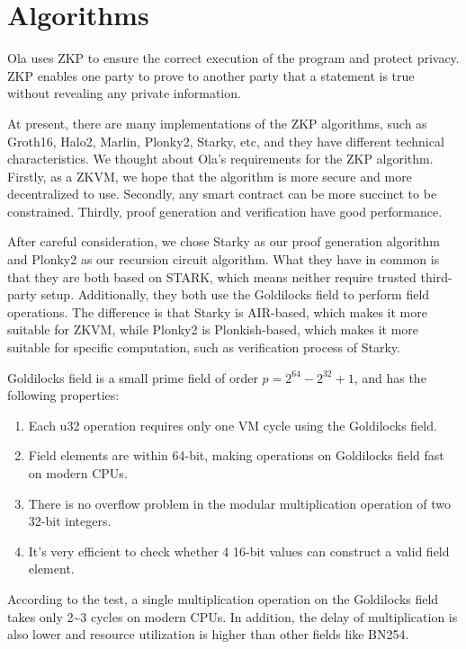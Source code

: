 \section{Algorithms} \label{sec:algorithms}
Ola uses ZKP to ensure the correct execution of the program and protect privacy. ZKP enables one party to prove to another party that a statement is true without revealing any private information.

At present, there are many implementations of the ZKP algorithms, such as Groth16, Halo2, Marlin, Plonky2, Starky, etc, and they have different technical characteristics. We thought about Ola's requirements for the ZKP algorithm. Firstly, as a ZKVM, we hope that the algorithm is more secure and more decentralized to use. Secondly, any smart contract can be more succinct to be constrained. Thirdly, proof generation and verification have good performance.

After careful consideration, we chose Starky as our proof generation algorithm and Plonky2 as our recursion circuit algorithm. What they have in common is that they are both based on STARK, which means neither require trusted third-party setup. Additionally, they both use the Goldilocks field to perform field operations. The difference is that Starky is AIR-based, which makes it more suitable for ZKVM, while Plonky2 is Plonkish-based, which makes it more suitable for specific computation, such as verification process of Starky.

Goldilocks field is a small prime field of order $p = 2^{64} - 2^{32} + 1$, and has the following properties:

\begin{enumerate}
    \item Each u32 operation requires only one VM cycle using the Goldilocks field.
    \item Field elements are within 64-bit, making operations on Goldilocks field fast on modern CPUs.
    \item There is no overflow problem in the modular multiplication operation of two 32-bit integers.
    \item It's very efficient to check whether 4 16-bit values can construct a valid field element.
\end{enumerate}

According to the test, a single multiplication operation on the Goldilocks field takes only 2\textasciitilde3 cycles on modern CPUs. In addition, the delay of multiplication is also lower and resource utilization is higher than other fields like BN254.








